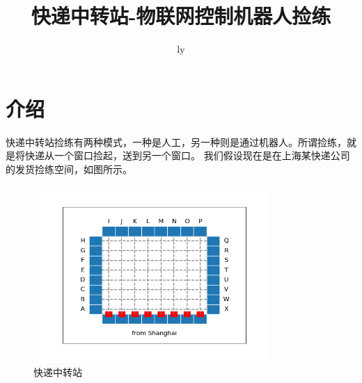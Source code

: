 \documentclass{article}
\title{快递中转站-物联网控制机器人捡练}
\author{ly}
\begin{document}
\maketitle
\section{介绍}
快递中转站捡练有两种模式，一种是人工，另一种则是通过机器人。所谓捡练，就是将快递从一个窗口捡起，送到另一个窗口。
我们假设现在是在上海某快递公司的发货捡练空间，如图所示。
\begin{figure}[htbp]
\centering
\includegraphics[width=0.8\textwidth]{asserts/Figure_1.png}
\caption{快递中转站}
\end{figure}
\end{document}
